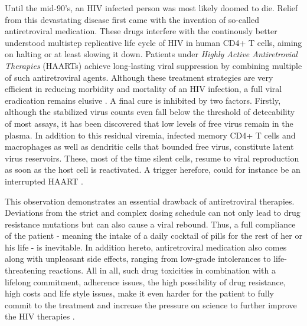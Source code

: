 Until the mid-90's, an HIV infected person was most likely doomed to die.
Relief from this devastating disease first came with the invention of so-called antiretroviral medication.
These drugs interfere with the continously better understood multistep replicative life cycle of HIV in 
human CD4+ T cells, aiming on halting or at least slowing it down.
Patients under \textit{Highly Active Antiretrovial Therapies} (HAARTs) achieve long-lasting viral suppression by 
combining multiple of such antiretroviral agents.
Although these treatment strategies are very efficient in reducing morbidity and mortality of an HIV infection, a
full viral eradication remains elusive \cite{pau2014antiretroviral,simon2006hiv}.
A final cure is inhibited by two factors.
Firstly, although the stabilized virus counts even fall below the threshold of detecability of most assays, 
it has been discovered that low levels of free virus remain in the plasma.
In addition to this residual viremia, infected memory CD4+ T cells and macrophages as well as dendritic cells that bounded 
free virus, constitute latent virus reservoirs.
These, most of the time silent cells, resume to viral reproduction as soon as the host cell is reactivated.
A trigger herefore, could for instance be an interrupted HAART \cite{ruelas2013integrated,shen2008viral}.\par

This observation demonstrates an essential drawback of antiretroviral therapies. Deviations from the strict and 
complex dosing schedule can not only lead to drug resistance mutations but can also cause a viral rebound.
Thus, a full compliance of the patient - meaning the intake of a daily cocktail of pills for the rest of her or his life - is inevitable.
In addition hereto, antiretroviral medication also comes along with unpleasant side effects, ranging from low-grade intolerances to 
life-threatening reactions.
All in all, such drug toxicities in combination with a lifelong commitment, adherence issues, the high possibility of drug resistance, 
high costs and life style issues, make it even harder for the patient to fully commit to the treatment and increase the pressure on science
to further improve the HIV therapies \cite{lu2018haart,pau2014antiretroviral}.\par

